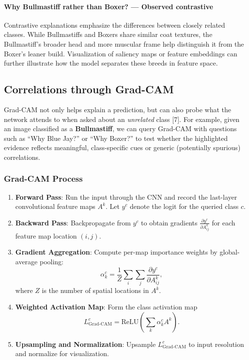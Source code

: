 \documentclass{article}
\renewcommand{\cite}[1]{[#1]}
\begin{document}
\paragraph{Why Bullmastiff rather than Boxer? — Observed contrastive}
Contrastive explanations emphasize the differences between closely related classes. While Bullmastiffs and Boxers share similar coat textures, the Bullmastiff’s broader head and more muscular frame help distinguish it from the Boxer’s leaner build. Visualization of saliency maps or feature embeddings can further illustrate how the model separates these breeds in feature space.

\subsection{Correlations through Grad-CAM}
Grad-CAM not only helps explain a prediction, but can also probe what the network
attends to when asked about an \emph{unrelated} class  \cite{7}. For example, given an image
classified as a \textbf{Bullmastiff}, we can query Grad-CAM with questions such as
``Why Blue Jay?'' or ``Why Boxer?'' to test whether the highlighted evidence reflects
meaningful, class-specific cues or generic (potentially spurious) correlations.

\subsubsection*{Grad-CAM Process}
\begin{enumerate}
  \item \textbf{Forward Pass}: Run the input through the CNN and record the last-layer
  convolutional feature maps \(A^k\). Let \(y^c\) denote the logit for the queried class \(c\).

  \item \textbf{Backward Pass}: Backpropagate from \(y^c\) to obtain gradients
  \(\frac{\partial y^c}{\partial A^k_{ij}}\) for each feature map location \((i,j)\).

  \item \textbf{Gradient Aggregation}: Compute per-map importance weights by global-average pooling:
  \[
    \alpha_k^c = \frac{1}{Z}\sum_{i}\sum_{j}\frac{\partial y^c}{\partial A^k_{ij}},
  \]
  where \(Z\) is the number of spatial locations in \(A^k\).

  \item \textbf{Weighted Activation Map}: Form the class activation map
  \[
    L_{\text{Grad-CAM}}^c = \mathrm{ReLU}\!\left(\sum_k \alpha_k^c A^k\right).
  \]

  \item \textbf{Upsampling and Normalization}: Upsample \(L_{\text{Grad-CAM}}^c\) to input resolution
  and normalize for visualization.
\end{enumerate}
\end{document}
